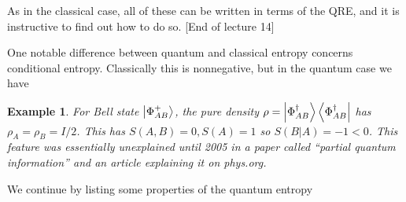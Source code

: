 \documentclass{article}
\newtheorem{example}{Example}
\theoremstyle{definition}
\begin{document}
As in the classical case, all of these can be written in terms of the QRE, and 
it is instructive to find out how to do so. [End of lecture 14]

One notable difference between quantum and classical entropy concerns 
conditional entropy. Classically this is nonnegative, but in the quantum case
we have
\begin{example}
  For Bell state $\ket{\Phi_{AB}^+}$, the pure density $\rho = 
  \ket{\Phi_{AB}^\dagger} \bra{\Phi_{AB}^\dagger}$ has $\rho_A = \rho_B = 
  I / 2$. This has $S(A, B) = 0, S(A) = 1$ so $S(B | A) = -1 < 0$. This feature
  was essentially unexplained until 2005 in a paper called ``partial quantum
  information'' and an article explaining it on phys.org.
\end{example}

We continue by listing some properties of the quantum entropy
\end{document}
